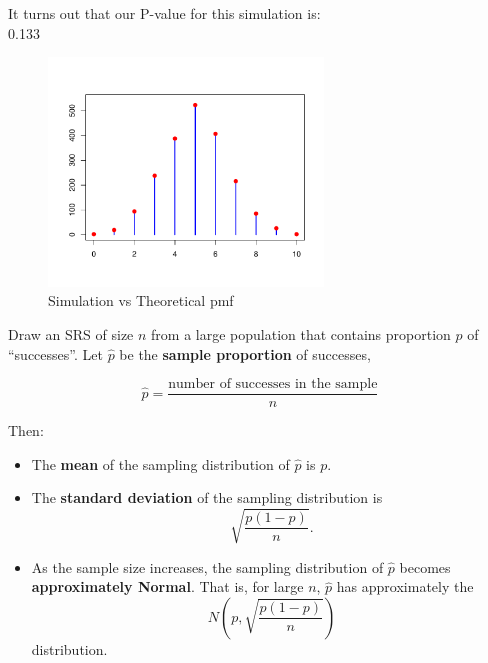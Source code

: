 It turns out that our P-value for this simulation is: \\
0.133
\begin{figure}[H]
  \centering
  \includegraphics[width=0.65\textwidth]{section11/images/sim_vs_theoretical_pmf.pdf}
  \vspace{-2em} %
\captionsetup{skip=0pt}
  \caption{Simulation vs Theoretical pmf}
\end{figure}
\begin{tcolorbox}[colback=yellow!5, colframe=yellow!50!black, title={Sampling Distribution of a Sample Proportion}, sharp corners, boxrule=0.4pt, width=\textwidth, breakable]

Draw an SRS of size $n$ from a large population that contains proportion $p$ of “successes”. Let $\hat{p}$ be the \textbf{sample proportion} of successes,

\[
\hat{p} = \frac{\text{number of successes in the sample}}{n}
\]

Then:

\begin{itemize}
  \item The \textbf{mean} of the sampling distribution of $\hat{p}$ is $p$.
  \item The \textbf{standard deviation} of the sampling distribution is
  \[
  \sqrt{\frac{p(1 - p)}{n}}.
  \]
\end{itemize}

\vspace{0.75em}

\begin{itemize}
  \item As the sample size increases, the sampling distribution of $\hat{p}$ becomes \textbf{approximately Normal}. That is, for large $n$, $\hat{p}$ has approximately the
  \[
  N\left(p, \sqrt{\frac{p(1 - p)}{n}}\right)
  \]
  distribution.
\end{itemize}

\end{tcolorbox}
